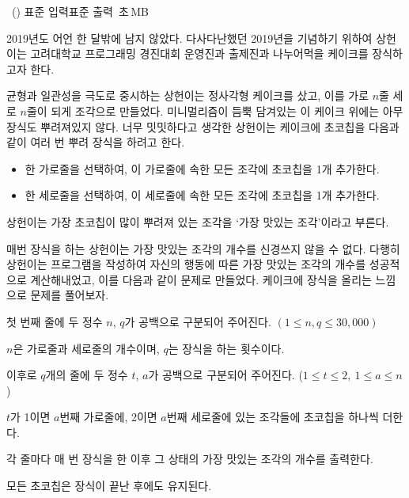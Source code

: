 \begin{problem}{\kcpcprobcake\ (\kcpcprobcakeshort)}
    {표준 입력}{표준 출력}
    {\kcpcprobcaketime\,초}{\kcpcprobcakememory\,MB}{}
    
    2019년도 어언 한 달밖에 남지 않았다. 다사다난했던 2019년을 기념하기 위하여 상헌이는 고려대학교 프로그래밍 경진대회 운영진과 출제진과 나누어먹을 케이크를 장식하고자 한다.
    
    균형과 일관성을 극도로 중시하는 상헌이는 정사각형 케이크를 샀고, 이를 가로 $n$줄 세로 $n$줄이 되게 조각으로 만들었다. 미니멀리즘이 듬뿍 담겨있는 이 케이크 위에는 아무 장식도 뿌려져있지 않다. 너무 밋밋하다고 생각한 상헌이는 케이크에 초코칩을 다음과 같이 여러 번 뿌려 장식을 하려고 한다.
    
    \begin{itemize}
        \item 한 가로줄을 선택하여, 이 가로줄에 속한 모든 조각에 초코칩을 1개 추가한다.
        \item 한 세로줄을 선택하여, 이 세로줄에 속한 모든 조각에 초코칩을 1개 추가한다.
    \end{itemize}
    
    상헌이는 가장 초코칩이 많이 뿌려져 있는 조각을 `가장 맛있는 조각'이라고 부른다.
    
    매번 장식을 하는 상헌이는 가장 맛있는 조각의 개수를 신경쓰지 않을 수 없다. 다행히 상헌이는 프로그램을 작성하여 자신의 행동에 따른 가장 맛있는 조각의 개수를 성공적으로 계산해내었고, 이를 다음과 같이 문제로 만들었다. 케이크에 장식을 올리는 느낌으로 문제를 풀어보자.

    
    \InputFile
    첫 번째 줄에 두 정수 $n$, $q$가 공백으로 구분되어 주어진다. $(1 \leq n, q \leq 30,000)$
    
    $n$은 가로줄과 세로줄의 개수이며, $q$는 장식을 하는 횟수이다. 
    
    이후로 $q$개의 줄에 두 정수 $t$, $a$가 공백으로 구분되어 주어진다. ($1 \leq t \leq 2,\ 1 \leq a \leq n$)
    
    $t$가 1이면 $a$번째 가로줄에, 2이면 $a$번째 세로줄에 있는 조각들에 초코칩을 하나씩 더한다.
    
    \OutputFile
    각 줄마다 매 번 장식을 한 이후 그 상태의 가장 맛있는 조각의 개수를 출력한다.
    
    모든 초코칩은 장식이 끝난 후에도 유지된다.
    
    \Examples
    \begin{example}
    \end{example}
\end{problem}

